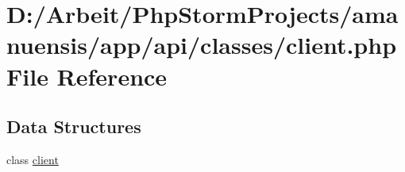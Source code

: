 \hypertarget{client_8php}{}\section{D\+:/\+Arbeit/\+Php\+Storm\+Projects/amanuensis/app/api/classes/client.php File Reference}
\label{client_8php}
\subsection*{Data Structures}
\begin{DoxyCompactItemize}
\item 
class \hyperlink{classclient}{client}
\end{DoxyCompactItemize}
